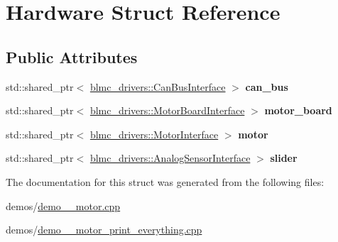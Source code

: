 \hypertarget{structHardware}{}\section{Hardware Struct Reference}
\label{structHardware}
\subsection*{Public Attributes}
\begin{DoxyCompactItemize}
\item 
std\+::shared\+\_\+ptr$<$ \hyperlink{classblmc__drivers_1_1CanBusInterface}{blmc\+\_\+drivers\+::\+Can\+Bus\+Interface} $>$ {\bfseries can\+\_\+bus}\hypertarget{structHardware_af6014d03d5d50bacf8c96e841cf8184d}{}\label{structHardware_af6014d03d5d50bacf8c96e841cf8184d}

\item 
std\+::shared\+\_\+ptr$<$ \hyperlink{classblmc__drivers_1_1MotorBoardInterface}{blmc\+\_\+drivers\+::\+Motor\+Board\+Interface} $>$ {\bfseries motor\+\_\+board}\hypertarget{structHardware_a6882a74056ffaa2a946b0f9b98d00b02}{}\label{structHardware_a6882a74056ffaa2a946b0f9b98d00b02}

\item 
std\+::shared\+\_\+ptr$<$ \hyperlink{classblmc__drivers_1_1MotorInterface}{blmc\+\_\+drivers\+::\+Motor\+Interface} $>$ {\bfseries motor}\hypertarget{structHardware_a78675cea76da541862144708a3996dcc}{}\label{structHardware_a78675cea76da541862144708a3996dcc}

\item 
std\+::shared\+\_\+ptr$<$ \hyperlink{classblmc__drivers_1_1AnalogSensorInterface}{blmc\+\_\+drivers\+::\+Analog\+Sensor\+Interface} $>$ {\bfseries slider}\hypertarget{structHardware_ac10da22a00e796b078624795da7e835d}{}\label{structHardware_ac10da22a00e796b078624795da7e835d}

\end{DoxyCompactItemize}


The documentation for this struct was generated from the following files\+:\begin{DoxyCompactItemize}
\item 
demos/\hyperlink{demo__1__motor_8cpp}{demo\+\_\+\_\+motor.\+cpp}\item 
demos/\hyperlink{demo__1__motor__print__everything_8cpp}{demo\+\_\+\_\+motor\+\_\+print\+\_\+everything.\+cpp}\end{DoxyCompactItemize}
